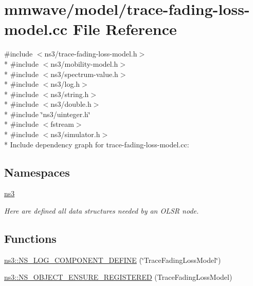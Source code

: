 \hypertarget{mmwave_2model_2trace-fading-loss-model_8cc}{}\section{mmwave/model/trace-\/fading-\/loss-\/model.cc File Reference}
\label{mmwave_2model_2trace-fading-loss-model_8cc}
{\ttfamily \#include $<$ns3/trace-\/fading-\/loss-\/model.\+h$>$}\\*
{\ttfamily \#include $<$ns3/mobility-\/model.\+h$>$}\\*
{\ttfamily \#include $<$ns3/spectrum-\/value.\+h$>$}\\*
{\ttfamily \#include $<$ns3/log.\+h$>$}\\*
{\ttfamily \#include $<$ns3/string.\+h$>$}\\*
{\ttfamily \#include $<$ns3/double.\+h$>$}\\*
{\ttfamily \#include \char`\"{}ns3/uinteger.\+h\char`\"{}}\\*
{\ttfamily \#include $<$fstream$>$}\\*
{\ttfamily \#include $<$ns3/simulator.\+h$>$}\\*
Include dependency graph for trace-\/fading-\/loss-\/model.cc\+:
\subsection*{Namespaces}
\begin{DoxyCompactItemize}
\item 
 \hyperlink{namespacens3}{ns3}
\begin{DoxyCompactList}\small\item\em Here are defined all data structures needed by an O\+L\+SR node. \end{DoxyCompactList}\end{DoxyCompactItemize}
\subsection*{Functions}
\begin{DoxyCompactItemize}
\item 
\hyperlink{namespacens3_a9aadb4926abd18448d1f813138530fec}{ns3\+::\+N\+S\+\_\+\+L\+O\+G\+\_\+\+C\+O\+M\+P\+O\+N\+E\+N\+T\+\_\+\+D\+E\+F\+I\+NE} (\char`\"{}Trace\+Fading\+Loss\+Model\char`\"{})
\item 
\hyperlink{namespacens3_aacec7655e3215ff2c90f9ecce704d9a7}{ns3\+::\+N\+S\+\_\+\+O\+B\+J\+E\+C\+T\+\_\+\+E\+N\+S\+U\+R\+E\+\_\+\+R\+E\+G\+I\+S\+T\+E\+R\+ED} (Trace\+Fading\+Loss\+Model)
\end{DoxyCompactItemize}
